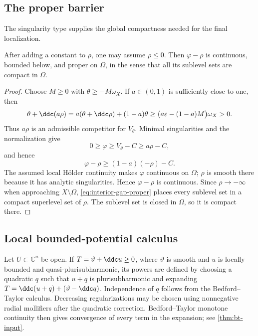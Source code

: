 \subsection{The proper barrier}\label{sec:interior-proper}

The singularity type supplies the global compactness needed for the final localization.

\begin{lemma}\label{lem:interior-proper-gap}
After adding a constant to $\rho$, one may assume $\rho\leq0$. Then $\varphi-\rho$ is continuous, bounded below, and proper on $\Omega$, in the sense that all its sublevel sets are compact in $\Omega$.
\end{lemma}

\begin{proof}
Choose $M\geq0$ with $\theta\geq-M\omega_X$. If $a\in(0,1)$ is sufficiently close to one, then
\[
  \theta+\ddc(a\rho)
  =a(\theta+\ddc\rho)+(1-a)\theta
  \geq\bigl(a\varepsilon-(1-a)M\bigr)\omega_X>0.
\]
Thus $a\rho$ is an admissible competitor for $V_\theta$. Minimal singularities and the normalization give
\[
  0\geq\varphi\geq V_\theta-C\geq a\rho-C,
\]
and hence
\begin{equation}\label{eq:interior-gap-proper}
  \varphi-\rho\geq(1-a)(-\rho)-C.
\end{equation}
The assumed local H\"older continuity makes $\varphi$ continuous on $\Omega$; $\rho$ is smooth there because it has analytic singularities. Hence $\varphi-\rho$ is continuous. Since $\rho\to-\infty$ when approaching $X\setminus\Omega$, \eqref{eq:interior-gap-proper} places every sublevel set in a compact superlevel set of $\rho$. The sublevel set is closed in $\Omega$, so it is compact there.
\end{proof}

\subsection{Local bounded-potential calculus}\label{sec:interior-calculus}

Let $U\subset\mathbb C^n$ be open. If $T=\vartheta+\ddc u\geq0$, where $\vartheta$ is smooth and $u$ is locally bounded and quasi-plurisubharmonic, its powers are defined by choosing a quadratic $q$ such that $u+q$ is plurisubharmonic and expanding $T=\ddc(u+q)+(\vartheta-\ddc q)$. Independence of $q$ follows from the Bedford--Taylor calculus. Decreasing regularizations may be chosen using nonnegative radial mollifiers after the quadratic correction. Bedford--Taylor monotone continuity then gives convergence of every term in the expansion; see \cref{thm:bt-input}.

